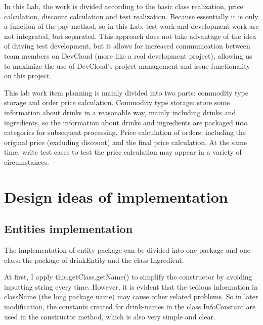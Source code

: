 \documentclass[a4paper]{report}
\begin{document}
In this Lab, the work is divided according to the basic class realization, price calculation, discount calculation and test realization. Because essentially it is only a function of the pay method, so in this Lab, test work and development work are not integrated, but separated. This approach does not take advantage of the idea of driving test development, but it allows for increased communication between team members on DevCloud (more like a real development project), allowing us to maximize the use of DevCloud's project management and issue functionality on this project.

\par

This lab work item planning is mainly divided into two parts: commodity type storage and order price calculation. Commodity type storage: store some information about drinks in a reasonable way, mainly including drinks and ingredients, so the information about drinks and ingredients are packaged into categories for subsequent processing. Price calculation of orders: including the original price (excluding discount) and the final price calculation. At the same time, write test cases to test the price calculation may appear in a variety of circumstances.



\chapter{Design ideas of implementation}
\section{Entities implementation}
The implementation of entity package can be divided into one package and one class: the package of drinkEntity and the class Ingredient.
\par At first, I apply this.getClass.getName() to simplify the constructor by avoiding inputting string every time. However, it is evident that the tedious information in className (the long package name) may cause other related problems. So in later modification, the constants created for drink-names in the class InfoConstant are used in the constructor method, which is also very simple and clear.
\end{document}
